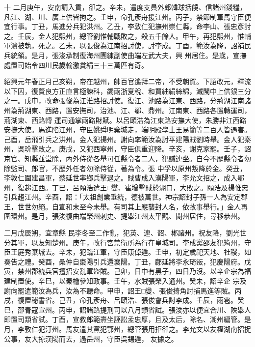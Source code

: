 \begin{pinyinscope}
 十
 二月庚午，安南請入貢，卻之。辛未，遣度支員外郎韓球括饒、信諸州錢糧，凡江、湖、川、廣上供皆拘之。壬申，命孔彥舟援江州。丙子，禁節制軍馬守臣便宜行事。丁丑，馬進分兵犯洪州。乙丑，李敦仁犯撫州崇仁縣，命李山、張忠彥討之。壬辰，金人犯熙州，總管劉惟輔戰敗之，殺五千餘人。甲午，再犯熙州，惟輔軍潰被執，死之。乙未，以張俊為江南招討使，討李成。丁酉，範汝為降，詔補民兵統領。是月，張浚承制復海州團練副使曲端左武大夫，興
 州居住。是歲，宣撫處置司始令四川民歲輸激賞絹三十三萬匹有奇。



 紹興元年春正月己亥朔，帝在越州，帥百官遙拜二帝，不受朝賀。下詔改元，釋流以下囚，復賢良方正直言極諫科，蠲兩浙夏稅、和買紬絹絲綿，減閩中上供銀三分之一。戊申，改命張俊為江淮路招討使。復江、池路為江東、西路，分荊湖江南諸州為荊湖東、西路，置安撫司，治池、江、鄂、鼎州。江南東、西路各置轉運司，荊湖東、西路轉
 運司通掌兩路財賦。以呂頤浩為江東路安撫大使，朱勝非江西路安撫大使。馬進陷江州，守臣姚舜明棄城走，端明殿學士王易簡等二百人皆遇害。己酉，岳飛引兵之洪州。金人犯揚州。謝向率範汝為討平建陽賊劉時舉。金人犯秦州，吳玠擊敗之。庚戌，又犯西寧州，守臣俱重迎降。辛亥，謝克家罷。壬子，詔京官、知縣並堂除，內外侍從各舉可任縣令者二人，犯贓連坐。自今不歷縣令者勿除監司、郎官，不歷外任者勿除侍從，著為令。張
 中孚以原州叛降於金。癸丑，李敦仁圍建昌軍，蔡延世率鄉兵擊退之。賊曹成入漢陽軍，李允文招之，成入鄂州，復趨江西。丁巳，呂頤浩遣王□燮、崔增擊賊於湖口，大敗之。頤浩及楊惟忠引兵趨江州。辛酉，詔：「太祖創業垂統，德被萬世。神宗詔封子孫一人為安定郡王，世世勿絕。自宣和末至今未舉。有司其上應襲封人名，依故事舉行。」金人再圍環州。是月，張浚復曲端榮州刺史、提舉江州太平觀、閬州居住，尋移恭州。



 二月戊辰朔，宜章縣
 民李冬至二作亂，犯英、連、韶、郴諸州。祝友降，劉光世分其軍，以友知楚州。庚午，改行宮禁衛所為行在皇城司。李成黨邵友犯筠州，守臣王庭秀棄城去。辛未，犯臨江軍，守臣康倬遁。壬申，初定歲祀天地、社稷，如奏告之禮。癸酉，桑仲自棗陽引兵還襄陽。丁丑，鄜延將李永琦叛，犯慶陽府。戊寅，禁州郡統兵官擅招安亂軍盜賊。己卯，日中有黑子，四日乃沒。以辛企宗為福建制置使。辛巳，以秦檜參知政事。壬午，水賊張榮入通州。癸未，詔辛企
 宗及謝向罷遣範汝為兵，汝為不聽命。甲申，詔王□燮、張俊掎角討捕馬進等賊。丙戌，復置秘書省。己丑，命孔彥舟、呂頤浩、張俊會兵討李成。壬辰，雨雹。癸巳，邵青寇宣州。丙申，詔諸路提刑司以八月類省試。張浚亦以便宜合川、陜舉人即置司類省試。丁酉，宣教郎範燾坐誣訟孟忠厚，且及太后，除名、潮州編管。是月，李敦仁犯汀州。馬友遣其黨犯鄂州，總管張用拒卻之。李允文以友權湖南招捉公事，友大掠漢陽而去，過岳州，守臣吳錫遁，
 友據之。




\end{pinyinscope}
